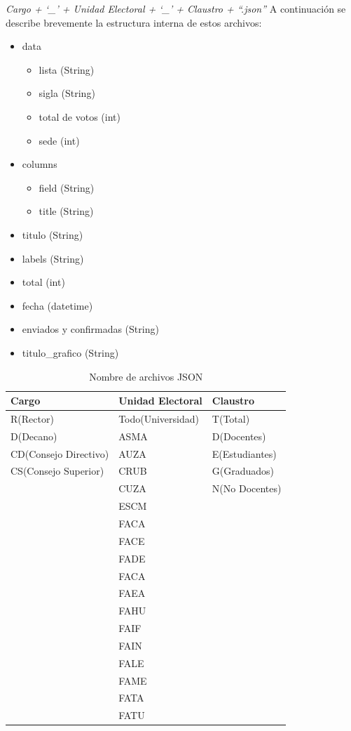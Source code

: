 \emph{Cargo + `\_' + Unidad Electoral + `\_' + Claustro + ``.json''} \newline
A continuación se describe brevemente la estructura interna de estos archivos:
\begin{itemize}
    \item data 
    \begin{itemize}
        \item lista (String)
        \item sigla (String)
        \item total de votos (int)
        \item sede (int)
    \end{itemize}
    \item columns 
    \begin{itemize}
        \item field (String)
        \item title (String)
    \end{itemize}
    \item titulo (String)
    \item labels (String)
    \item total (int)
    \item fecha (datetime)
    \item enviados y confirmadas (String)
    \item titulo\_grafico (String)
\end{itemize}




\begin{table}[htbp]
\begin{center}
\begin{tabular}{|l|l|l|}
\hline
Cargo & Unidad Electoral &  Claustro\\
\hline \hline 
R(Rector) & Todo(Universidad) & T(Total)\\ \hline
D(Decano) & ASMA & D(Docentes)\\ \hline
CD(Consejo Directivo) & AUZA & E(Estudiantes)\\ \hline
CS(Consejo Superior) & CRUB & G(Graduados)\\ \hline
& CUZA & N(No Docentes) \\ \hline
& ESCM & \\ \hline
& FACA & \\ \hline
& FACE & \\ \hline
& FADE & \\ \hline
& FACA & \\ \hline
& FAEA & \\ \hline
& FAHU & \\ \hline
& FAIF & \\ \hline
& FAIN & \\ \hline
& FALE & \\ \hline
& FAME & \\ \hline
& FATA & \\ \hline
& FATU & \\ \hline
\end{tabular}
\end{center}
\caption{Nombre de archivos JSON}
\label{tab:formatoJSON}
\end{table}

